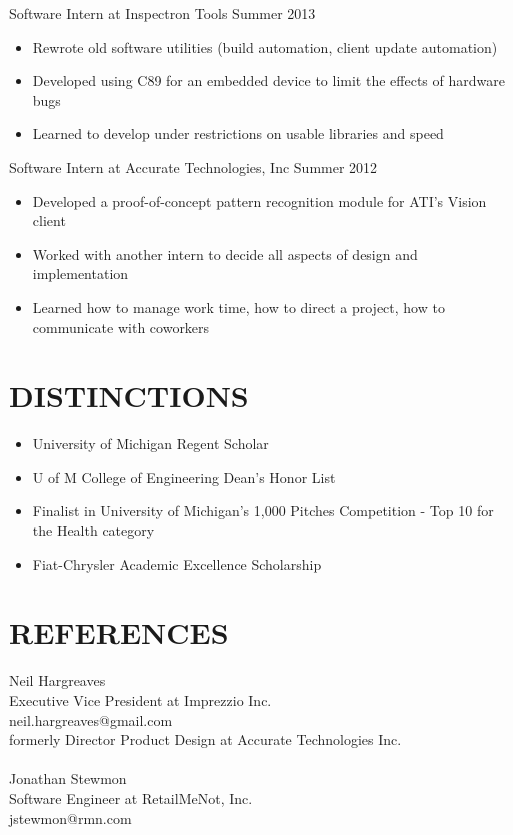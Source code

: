 \documentclass[line,margin]{res}
\begin{document}
\begin{resume}
                {\sc Software Intern at Inspectron Tools} \hfill Summer 2013
                 \begin{itemize}  \itemsep -2pt %
                 \item Rewrote old software utilities (build automation, client update automation)
                 \item Developed using C89 for an embedded device to limit the effects of hardware bugs
                 \item Learned to develop under restrictions on usable libraries and speed
                 \end{itemize}
 
                {\sc Software Intern at Accurate Technologies, Inc} \hfill            Summer 2012
                 \begin{itemize}  \itemsep -2pt %
                 \item Developed a proof-of-concept pattern recognition module for ATI’s Vision client
                 \item Worked with another intern to decide all aspects of design and implementation
                 \item Learned how to manage work time, how to direct a project, how to communicate with coworkers
                 \end{itemize} 

\section{\textcolor{HeaderColor}{DISTINCTIONS}}
    \begin{itemize} \itemsep-0.2em
    \item University of Michigan Regent Scholar
    \item U of M College of Engineering Dean’s Honor List
    \item Finalist in University of Michigan's 1,000 Pitches Competition - Top 10 for the Health category
    \item Fiat-Chrysler Academic Excellence Scholarship
    \end{itemize}
 
\section{\textcolor{HeaderColor}{REFERENCES}}
    Neil Hargreaves\\
    Executive Vice President at Imprezzio Inc.\\
    neil.hargreaves@gmail.com\\
    formerly Director Product Design at Accurate Technologies Inc.\\
\\
    Jonathan Stewmon\\
    Software Engineer at RetailMeNot, Inc.\\
    jstewmon@rmn.com\\
 

\end{resume}
\end{document}
